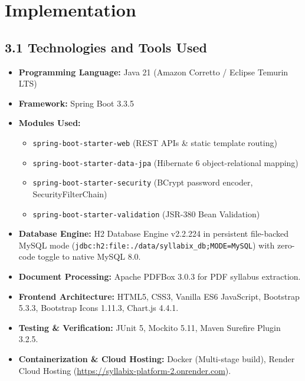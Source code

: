 \documentclass[12pt,a4paper]{report}
\begin{document}
\newpage
\chapter{\color{ThaparCrimson} Implementation}

\section{3.1 Technologies and Tools Used}
\begin{itemize}
    \item \textbf{Programming Language:} Java 21 (Amazon Corretto / Eclipse Temurin LTS)
    \item \textbf{Framework:} Spring Boot 3.3.5
    \item \textbf{Modules Used:}
    \begin{itemize}
        \item \texttt{spring-boot-starter-web} (REST APIs \& static template routing)
        \item \texttt{spring-boot-starter-data-jpa} (Hibernate 6 object-relational mapping)
        \item \texttt{spring-boot-starter-security} (BCrypt password encoder, SecurityFilterChain)
        \item \texttt{spring-boot-starter-validation} (JSR-380 Bean Validation)
    \end{itemize}
    \item \textbf{Database Engine:} H2 Database Engine v2.2.224 in persistent file-backed MySQL mode (\texttt{jdbc:h2:file:./data/syllabix\_db;MODE=MySQL}) with zero-code toggle to native MySQL 8.0.
    \item \textbf{Document Processing:} Apache PDFBox 3.0.3 for PDF syllabus extraction.
    \item \textbf{Frontend Architecture:} HTML5, CSS3, Vanilla ES6 JavaScript, Bootstrap 5.3.3, Bootstrap Icons 1.11.3, Chart.js 4.4.1.
    \item \textbf{Testing \& Verification:} JUnit 5, Mockito 5.11, Maven Surefire Plugin 3.2.5.
    \item \textbf{Containerization \& Cloud Hosting:} Docker (Multi-stage build), Render Cloud Hosting (\href{https://syllabix-platform-2.onrender.com}{https://syllabix-platform-2.onrender.com}).
\end{itemize}
\end{document}
